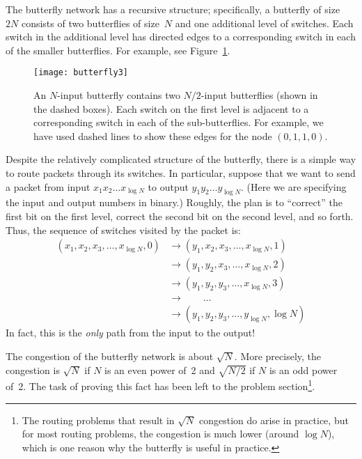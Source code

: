 The butterfly network has a recursive structure; specifically, a
butterfly of size~$2N$ consists of two butterflies of size~$N$ and one
additional level of switches.  Each switch in the additional level has
directed edges to a corresponding switch in each of the smaller
butterflies.  For example, see Figure~\ref{fig:6EP}.

\begin{figure}

\texttt{[image: butterfly3]}

\caption{An $N$-input butterfly contains two $N/2$-input butterflies
  (shown in the dashed boxes). Each switch on the first level is
  adjacent to a corresponding switch in each of the sub-butterflies.
  For example, we have used dashed lines to show these edges for the
  node $(0, 1, 1, 0)$.}

\label{fig:6EP}

\end{figure}

Despite the relatively complicated structure of the butterfly, there
is a simple way to route packets through its switches.  In particular,
suppose that we want to send a packet from input $x_1 x_2 \dots
x_{\log N}$ to output $y_1 y_2 \dots y_{\log N}$.  (Here we are
specifying the input and output numbers in binary.)  Roughly, the plan
is to ``correct'' the first bit on the first level, correct the second
bit on the second level, and so forth.  Thus, the sequence of switches
visited by the packet is:
%
\begin{align*}
(x_1, x_2, x_3, \dots, x_{\log N}, 0)
    & \to (y_1, x_2, x_3, \dots, x_{\log N}, 1) \\
    & \to (y_1, y_2, x_3, \dots, x_{\log N}, 2) \\
    & \to (y_1, y_2, y_3, \dots, x_{\log N}, 3) \\
    & \to \qquad \dots \\
    & \to (y_1, y_2, y_3, \dots, y_{\log N}, \log N)
\end{align*}
%
In fact, this is the \emph{only} path from the input to the output!

The congestion of the butterfly network is about $\sqrt{N}$.  More
precisely, the congestion is $\sqrt{N}$ if $N$ is an even power of~2
and $\sqrt{N/2}$ if $N$ is an odd power of~2.  The task of proving
this fact has been left to the problem section\footnote{The routing
  problems that result in $\sqrt{N}$ congestion do arise in practice,
  but for most routing problems, the congestion is much lower (around
  $\log N$), which is one reason why the butterfly is useful in
  practice.}.

